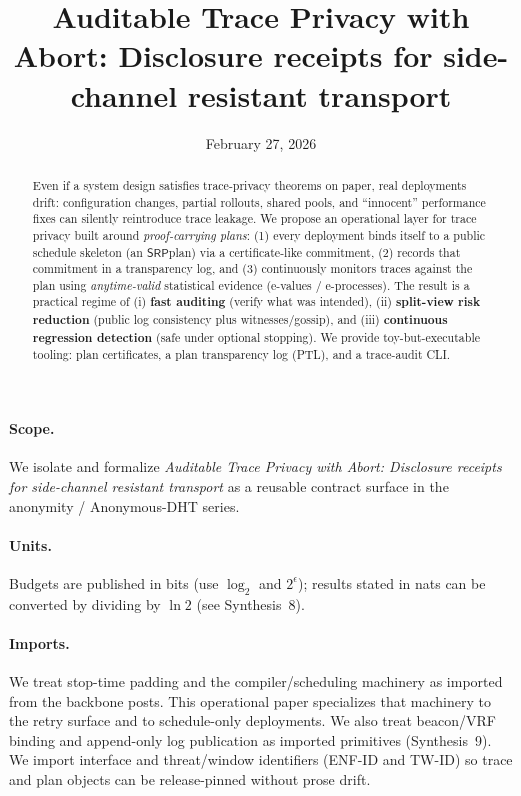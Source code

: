\documentclass[11pt]{article}
\title{Auditable Trace Privacy with Abort: Disclosure receipts for side-channel resistant transport}
\author{}
\date{February 27, 2026}
\newcommand{\SRP}{\ensuremath{\mathsf{SRP}}}
\begin{document}
\maketitle

\begin{abstract}
Even if a system design satisfies trace-privacy theorems on paper, real deployments drift:
configuration changes, partial rollouts, shared pools, and ``innocent'' performance fixes can silently reintroduce trace leakage.
We propose an operational layer for trace privacy built around \emph{proof-carrying plans}:
(1) every deployment binds itself to a public schedule skeleton (an \SRP plan) via a certificate-like commitment,
(2) records that commitment in a transparency log, and
(3) continuously monitors traces against the plan using \emph{anytime-valid} statistical evidence (e-values / e-processes).
The result is a practical regime of (i) \textbf{fast auditing} (verify what was intended),
(ii) \textbf{split-view risk reduction} (public log consistency plus witnesses/gossip), and
(iii) \textbf{continuous regression detection} (safe under optional stopping).
We provide toy-but-executable tooling: plan certificates, a plan transparency log (PTL), and a trace-audit CLI.
\end{abstract}

\paragraph{Scope.}
We isolate and formalize \emph{Auditable Trace Privacy with Abort: Disclosure receipts for side-channel resistant transport} as a reusable contract surface in the anonymity / Anonymous-DHT series.

\paragraph{Units.} Budgets are published in bits (use $\log_2$ and $2^{\epsilon}$); results stated in nats can be converted by dividing by $\ln 2$ (see Synthesis~8).\cite{series:notation}

\paragraph{Imports.}
We treat stop-time padding and the compiler/scheduling machinery as imported from the backbone posts.\cite{series:schedcompiler,series:stoptimeaddendum}
This operational paper specializes that machinery to the retry surface and to schedule-only deployments.
We also treat beacon/VRF binding and append-only log publication as imported primitives (Synthesis~9).\cite{series:transparencyprimitives}
We import interface and threat/window identifiers (ENF-ID and TW-ID) so trace and plan objects can be release-pinned without prose drift.\cite{series:traceifaces,series:threatwindows}
\end{document}
